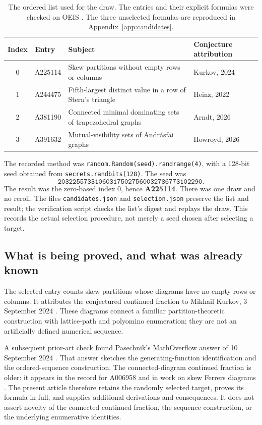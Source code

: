 \documentclass[11pt,letterpaper]{article}
\numberwithin{equation}{section}
\theoremstyle{definition}
\begin{document}
\begin{table}[htbp]
\centering\small
\begin{tabularx}{\textwidth}{@{}c l Y l@{}}
\toprule
Index & Entry & Subject & Conjecture attribution\\
 & A225114 & Skew partitions without empty rows or columns & Kurkov, 2024\\
1 & A244475 & Fifth-largest distinct value in a row of Stern's triangle & Heinz, 2022\\
2 & A381190 & Connected minimal dominating sets of trapezohedral graphs & Arndt, 2026\\
3 & A391632 & Mutual-visibility sets of Andr\'asfai graphs & Howroyd, 2026\\
\bottomrule
\end{tabularx}
\caption{The ordered list used for the draw. The entries and their explicit
formulas were checked on OEIS \cite{oeis225114,oeis244475,oeis381190,oeis391632}.
The three unselected formulas are reproduced in Appendix~\ref{app:candidates}.}
\end{table}

The recorded method was \texttt{random.Random(seed).randrange(4)}, with a
128-bit seed obtained from \texttt{secrets.randbits(128)}. The seed was
\[
 \texttt{203225573310603175027560032786773102290}.
\]
The result was the zero-based index $0$, hence \textbf{A225114}. There was one
draw and no reroll. The files \texttt{candidates.json} and
\texttt{selection.json} preserve the list and result; the verification
script checks the list's digest and replays the draw. This records the actual
selection procedure, not merely a seed chosen after selecting a target.

\subsection{What is being proved, and what was already known}
The selected entry counts skew partitions whose diagrams have no empty rows
or columns. It attributes the conjectured continued fraction to Mikhail
Kurkov, 3 September 2024 \cite{oeis225114}. These diagrams connect a familiar
partition-theoretic construction with lattice-path and polyomino enumeration;
they are not an artificially defined numerical sequence.

A subsequent prior-art check found Pasechnik's MathOverflow answer of
10 September 2024 \cite{pasechnik}. That answer sketches the generating-function
identification and the ordered-sequence construction. The connected-diagram
continued fraction is older: it appears in the record for A006958 and in
work on skew Ferrers diagrams \cite{oeis006958,bala}. The present article
therefore retains the randomly selected target, proves its formula in full,
and supplies additional derivations and consequences. It does not assert
novelty of the connected continued fraction, the sequence construction, or
the underlying enumerative identities.
\end{document}
